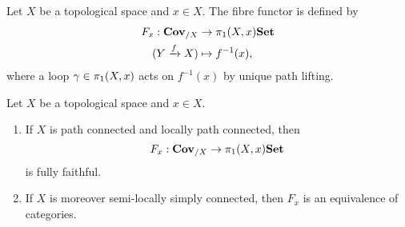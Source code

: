 \begin{defn}
    Let $X$ be a topological space and $x\in X$. The fibre functor is defined by
    \begin{align*}
        F_x: \catCoveringSpace_{/X} &\to \homotopy[1](X,x)\catSet\\
        (Y \xrightarrow{f} X) &\mapsto f^{-1}(x),
    \end{align*}
    where a loop $\gamma \in \homotopy[1](X,x)$ acts on $f^{-1}(x)$ by unique path lifting. 
\end{defn}

\begin{thm}[name=Monodromy correspondence]
    Let $X$ be a topological space and $x \in X$. 
    \begin{enumerate}
        \item If $X$ is path connected and locally path connected, then
        \[
            F_x: \catCoveringSpace_{/X} \to \homotopy[1](X,x)\catSet
        \] is fully faithful. 
        \item If $X$ is moreover semi-locally simply connected, then $F_x$ is an equivalence of categories. 
    \end{enumerate}
\end{thm}
